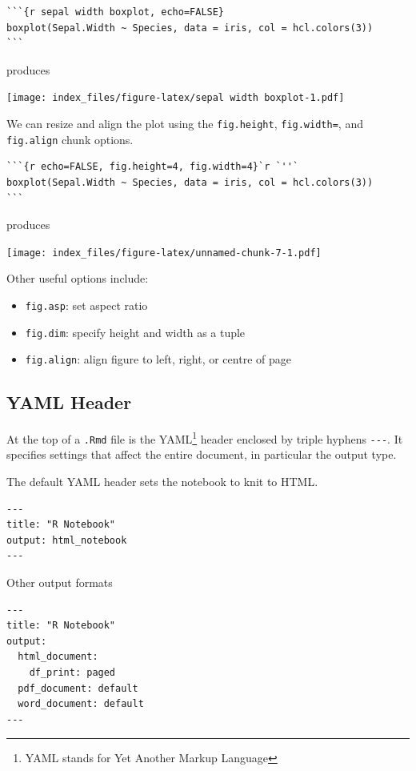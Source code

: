 \documentclass[]{article}
\providecommand{\tightlist}{%
  \setlength{\itemsep}{0pt}\setlength{\parskip}{0pt}}
\let\rmarkdownfootnote\footnote%
\def\footnote{\protect\rmarkdownfootnote}
\begin{document}
\begin{verbatim}
```{r sepal width boxplot, echo=FALSE}
boxplot(Sepal.Width ~ Species, data = iris, col = hcl.colors(3))
```
\end{verbatim}

produces

\texttt{[image: index\_files/figure-latex/sepal width boxplot-1.pdf]}

We can resize and align the plot using the \texttt{fig.height},
\texttt{fig.width=}, and \texttt{fig.align} chunk options.

\begin{verbatim}
```{r echo=FALSE, fig.height=4, fig.width=4}`r `''`
boxplot(Sepal.Width ~ Species, data = iris, col = hcl.colors(3))
```
\end{verbatim}

produces

\texttt{[image: index\_files/figure-latex/unnamed-chunk-7-1.pdf]}

Other useful options include:

\begin{itemize}
\tightlist
\item
  \texttt{fig.asp}: set aspect ratio
\item
  \texttt{fig.dim}: specify height and width as a tuple
\item
  \texttt{fig.align}: align figure to left, right, or centre of page
\end{itemize}

\hypertarget{yaml-header}{%
\subsection{YAML Header}\label{yaml-header}}

At the top of a \texttt{.Rmd} file is the YAML\footnote{YAML stands for
  Yet Another Markup Language} header enclosed by triple hyphens
\texttt{-\/-\/-}. It specifies settings that affect the entire document,
in particular the output type.

The default YAML header sets the notebook to knit to HTML.

\begin{verbatim}
---
title: "R Notebook"
output: html_notebook
---
\end{verbatim}

Other output formats

\begin{verbatim}
---
title: "R Notebook"
output:
  html_document:
    df_print: paged
  pdf_document: default
  word_document: default
---
\end{verbatim}
\end{document}
